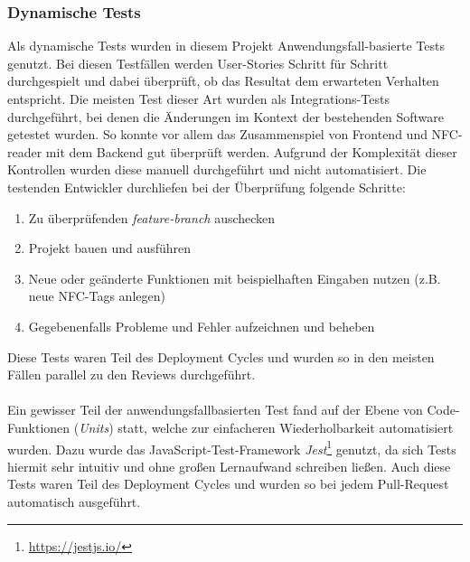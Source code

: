 \documentclass[10pt, a4paper]{article}
\begin{document}
\begin{onehalfspace}
  \subsubsection*{Dynamische Tests}
    Als dynamische Tests wurden in diesem Projekt Anwendungsfall-basierte Tests genutzt.
    Bei diesen Testfällen werden User-Stories Schritt für Schritt \glqq durchgespielt\grqq{} und dabei überprüft, ob das Resultat  dem erwarteten Verhalten entspricht.
    Die meisten Test dieser Art wurden als Integrations-Tests durchgeführt, bei denen die Änderungen im Kontext der bestehenden Software getestet wurden.
    So konnte vor allem das Zusammenspiel von Frontend und NFC-reader mit dem Backend gut überprüft werden.
    Aufgrund der Komplexität dieser Kontrollen wurden diese manuell durchgeführt und nicht automatisiert.
    Die testenden Entwickler durchliefen bei der Überprüfung folgende Schritte:
    \begin{enumerate}
      \item Zu überprüfenden \textit{feature-branch} auschecken
      \item Projekt bauen und ausführen
      \item Neue oder geänderte Funktionen mit beispielhaften Eingaben nutzen (z.B. neue NFC-Tags anlegen)
      \item Gegebenenfalls Probleme und Fehler aufzeichnen und beheben
    \end{enumerate}
    Diese Tests waren Teil des Deployment Cycles und wurden so in den meisten Fällen parallel zu den Reviews durchgeführt.
    \\~\\
    Ein gewisser Teil der anwendungsfallbasierten Test fand auf der Ebene von Code-Funktionen (\textit{Units}) statt, welche zur einfacheren Wiederholbarkeit automatisiert wurden.
    Dazu wurde das JavaScript-Test-Framework \textit{Jest}\footnote{\raggedright\url{https://jestjs.io/}} genutzt, da sich Tests hiermit sehr intuitiv und ohne großen Lernaufwand schreiben ließen.
    Auch diese Tests waren Teil des Deployment Cycles und wurden so bei jedem Pull-Request automatisch ausgeführt.



\end{onehalfspace}
\end{document}
